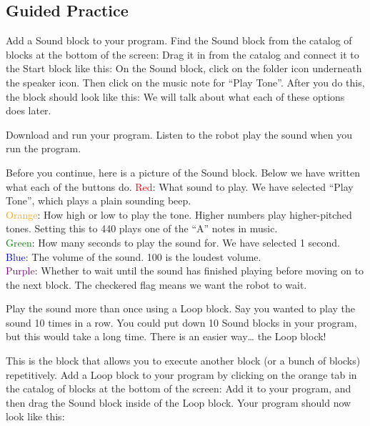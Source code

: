 \documentclass{lessonplan}
\begin{document}
    \subsection{Guided Practice}
    Add a Sound block to your program.
    Find the Sound block from the catalog of blocks at the bottom of the screen:
    Drag it in from the catalog and connect it to the Start block like this:
    On the Sound block, click on the folder icon underneath the speaker icon.  Then click on the music note for “Play Tone”. After you do this, the block should look like this:
    We will talk about what each of these options does later.
    \par
    Download and run your program.
    Listen to the robot play the sound when you run the program.
    \par
    Before you continue, here is a picture of the Sound block. Below we have written what each of the buttons do.
    \textcolor{red}{Red}: What sound to play. We have selected “Play Tone”, which plays a plain sounding beep. \hfill\\
    \textcolor{orange}{Orange}: How high or low to play the tone. Higher numbers play higher-pitched tones. Setting this to 440 plays one of the “A” notes in music.\hfill\\
    \textcolor{green}{Green}: How many seconds to play the sound for. We have selected 1 second.\hfill\\
    \textcolor{blue}{Blue}: The volume of the sound. 100 is the loudest volume.\hfill\\
    \textcolor{purple}{Purple}: Whether to wait until the sound has finished playing before moving on to the next block. The checkered flag means we want the robot to wait.\hfill\\
    \par
    Play the sound more than once using a Loop block.
    Say you wanted to play the sound 10 times in a row. You could put down 10 Sound blocks in your program, but this would take a long time. There is an easier way… the Loop block!
    \par
    This is the block that allows you to execute another block (or a bunch of blocks) repetitively. Add a Loop block to your program by clicking on the orange tab in the catalog of blocks at the bottom of the screen:
    Add it to your program, and then drag the Sound block inside of the Loop block. Your program should now look like this:
\end{document}
